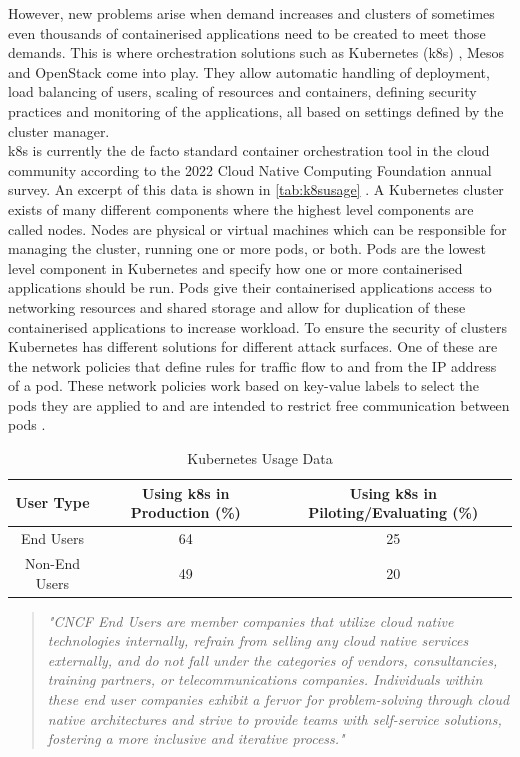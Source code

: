  However, new problems arise when demand increases and clusters of sometimes even thousands of containerised applications need to be created to meet those demands. This is where orchestration solutions such as Kubernetes (\acrshort{k8s}) \cite{Bernstein2014}, Mesos \cite{Mesos} and OpenStack \cite{Openstack} come into play. They allow automatic handling of deployment, load balancing of users, scaling of resources and containers, defining security practices and monitoring of the applications, all based on settings defined by the cluster manager.
\\[10pt]

\acrshort{k8s} is currently the de facto standard container orchestration tool in the cloud community according to the 2022 Cloud Native Computing Foundation annual survey. An excerpt of this data is shown in \autoref{tab:k8susage} \cite{CNCFSurvey}. A Kubernetes cluster exists of many different components where the highest level components are called nodes. Nodes are physical or virtual machines which can be responsible for managing the cluster, running one or more pods, or both. Pods are the lowest level component in Kubernetes and specify how one or more containerised applications should be run. Pods give their containerised applications access to networking resources and shared storage and allow for duplication of these containerised applications to increase workload. To ensure the security of clusters Kubernetes has different solutions for different attack surfaces. One of these are the network policies that define rules for traffic flow to and from the IP address of a pod. These network policies work based on key-value labels to select the pods they are applied to and are intended to restrict free communication between pods \cite{nps}.
\\[10pt]
\begin{table}[h]
    \centering
    \begin{tabular}{|c|c|c|}
        \hline
        \textbf{User Type} & \textbf{Using \acrshort{k8s} in Production (\%)} & \textbf{Using \acrshort{k8s} in Piloting/Evaluating (\%)} \\
        \hline
        End Users & 64 & 25 \\
        Non-End Users & 49 & 20 \\
        \hline
    \end{tabular}
    \caption{Kubernetes Usage Data \cite{CNCFSurvey}}
    \label{tab:k8susage}
\end{table}
\begin{quote}
\textit{"CNCF End Users are member companies that utilize cloud native technologies internally, refrain from selling any cloud native services externally, and do not fall under the categories of vendors, consultancies, training partners, or telecommunications companies. Individuals within these end user companies exhibit a fervor for problem-solving through cloud native architectures and strive to provide teams with self-service solutions, fostering a more inclusive and iterative process." \cite{CNCFSurvey}}
\end{quote}
